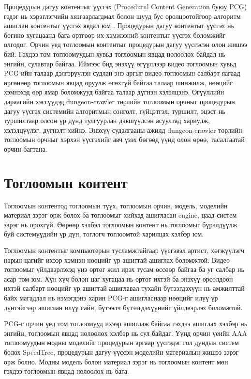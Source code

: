 Процедурын дагуу контентыг үүсгэх (Procedural Content Generation буюу PCG) гэдэг нь хэрэглэгчийн хязгаарлагдмал болон шууд бус оролцоотойгоор алгоритм ашиглан контентыг үүсгэх явдал юм \cite{PCG}. Процедурын дагуу контентыг үүсгэх нь богино хугацаанд бага өртгөөр их хэмжээний контентыг үүсгэх боломжийг олгодог. Орчин үед тоглоомын контентыг процедурын дагуу үүсгэсэн олон жишээ бий. Гэхдээ том тоглоомуудын хувьд тоглоомын явцад нөлөөлөх байдал нь энгийн, сулавтар байгаа. Иймээс бид энэхүү өгүүллээр видео тоглоомын хувьд PCG-ийн талаар дэлгэрүүлэн судлан энэ аргыг видео тоглоомын салбарт яагаад өргөнөөр тоглоомын явцад оруулж өгөхгүй байгаа талаар шинжилж, нөөцийг хэмнэхэд өөр ямар боломжууд байгаа талаар дүгнэн хэлэлцэнэ.
Өгүүллийн дараагийн хэсгүүдэд dungeon-crawler төрлийн тоглоомын орчныг процедурын дагуу үүсгэх системийн алгоритмын сонголт, гүйцэтгэл, туршилт, эцэст нь туршилтаар олсон үр дүнд тулгуурлан дэвшүүлсэн асуултад хариулж, хэлэлцүүлэг, дүгнэлт хийнэ.
Энэхүү судалгааны ажилд dungeon-crawler төрлийн тоглоомын орчныг хэрхэн үүсгэхийг авч үзэх бөгөөд үүнд олон өрөө, тасалгаатай орчин багтана.

\section{Тоглоомын контент}
Тоглоомын контентод тоглоомын түүх, тоглоомын орчин, модель, моделийн материал зэрэг орж болох ба тоглоомыг хийхэд ашигласан engine, цаад систем зэрэг нь орохгүй. Өөрөөр хэлбэл тоглоомын контент нь тоглоомыг бүрэлдүүлж буй системүүдийн үр дүн, тоглогч тоглоомтой харилцах хэлбэр юм.

Тоглоомын контентыг компьютерын тусламжтайгаар үүсгэвэл артист, хөгжүүлэгч нарын цагийг ихээр хэмнэн нөөцийг үр ашигтай ашиглах боломжтой. Видео тоглоомыг үйлдвэрлэхэд үнэ өртөг жил ирэх тусам өссөөр байгаа ба уг салбар нь асар том юм. Хүн хүч болон цаг хугацаа нь өртөг ихтэй ба энэхүү өрсөлдөөн ихтэй салбарт нөөцийг үр ашигтай ашиглавал тухайн бүтээгдэхүүн нь амжилттай байх магадлал нь нэмэгдэнэ харин PCG-г ашигласнаар нөөцийг илүү үр дүнтэйгээр ашиглан илүү сайн, бүтээлч бүтээгдэхүүнийг үйлдвэрлэх боломжтой.

PCG-г орчин үед том тоглоомууд ихээр ашиглаж байгаа гэхдээ ашиглах хэлбэр нь энгийн, тоглоомын явцад нөлөөлөх хэлбэр нь сул байдаг. Үүнд орчин үеийн AAA тоглоомуудын модны моделийг процедурын аргаар үүсгэдэг гол дундын систем болох SpeedTree, процедурын дагуу үүссэн моделийн материалын жишээ зэрэг орж болно. Модны модель болон материал зэрэг нь тоглоомын контент мөн гэхдээ тоглоомын явцад нөлөөлөх нь бага.

